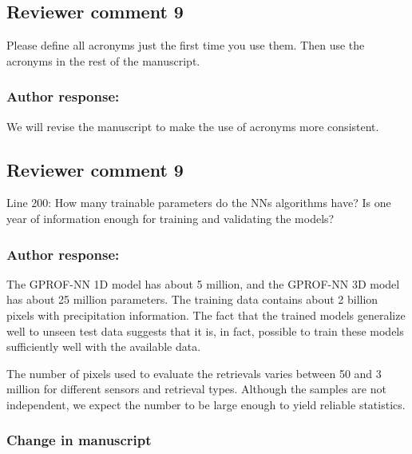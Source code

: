 \subsection*{Reviewer comment 9}

Please define all acronyms just the first time you use them. Then use the
acronyms in the rest of the manuscript.

\subsubsection*{Author response:}

We will revise the manuscript to make the use of acronyms more consistent.


\subsection*{Reviewer comment 9}

Line 200: How many trainable parameters do the NNs algorithms have? Is one year
of information enough for training and validating the models?

\subsubsection*{Author response:}


The GPROF-NN 1D model has about 5 million, and the GPROF-NN 3D model has about
25 million parameters. The training data contains about 2 billion pixels with
precipitation information. The fact that the trained models generalize well to
unseen test data suggests that it is, in fact, possible to train these models sufficiently
well with the available data.

The number of pixels used to evaluate the retrievals varies between 50 and 3
million for different sensors and retrieval types. Although the samples are not
independent, we expect the number to be large enough to yield reliable
statistics.

\subsubsection*{Change in manuscript}

